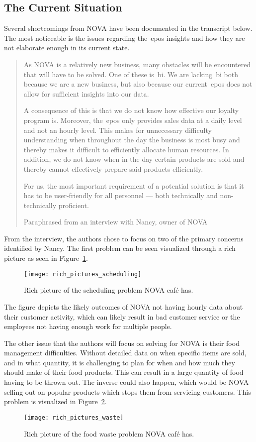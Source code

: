 \subsection{The Current Situation}\label{subsec:the-current-situation}

Several shortcomings from NOVA have been documented in the transcript below.
The most noticeable is the issues regarding the~\acrfull{epos} insights and how they are not elaborate enough in its
current state.

\blockquote[Paraphrased from an interview with Nancy, owner of NOVA]{As NOVA is a relatively new business, many
obstacles will be encountered that will have to be solved.
One of these is~\acrfull{bi}.
We are lacking~\acrshort{bi} both because we are a new business, but also because our current~\acrshort{epos} does not
allow for sufficient insights into our data.

A consequence of this is that we do not know how effective our loyalty program is.
Moreover, the~\acrshort{epos} only provides sales data at a daily level and not an hourly level.
This makes for unnecessary difficulty understanding when throughout the day the business is most busy and thereby makes
it difficult to efficiently allocate human resources.
In addition, we do not know when in the day certain products are sold and thereby cannot effectively prepare said
products efficiently.

For us, the most important requirement of a potential solution is that it has to be user-friendly for all personnel —
both technically and non-technically proficient.}

From the interview, the authors chose to focus on two of the primary concerns identified by Nancy.
The first problem can be seen visualized through a rich picture as seen in Figure~\ref{fig:pda-scheduling-problem}.

\begin{figure}[H]
    \centering
    \texttt{[image: rich\_pictures\_scheduling]}
    \caption{Rich picture of the scheduling problem NOVA café has.
    }\label{fig:pda-scheduling-problem}
\end{figure}

The figure depicts the likely outcomes of NOVA not having hourly data about their customer activity,
which can likely result in bad customer service or the employees not having enough work for multiple people.

The other issue that the authors will focus on solving for NOVA is their food management difficulties.
Without detailed data on when specific items are sold, and in what quantity, it is challenging to plan
for when and how much they should make of their food products.
This can result in a large quantity of food having to be thrown out.
The inverse could also happen, which would be NOVA selling out on popular products which stops them
from servicing customers.
This problem is visualized in Figure~\ref{fig:pda-waste-problem}.

\begin{figure}[H]
    \centering
    \texttt{[image: rich\_pictures\_waste]}
    \caption{Rich picture of the food waste problem NOVA café has.
    }\label{fig:pda-waste-problem}
\end{figure}
